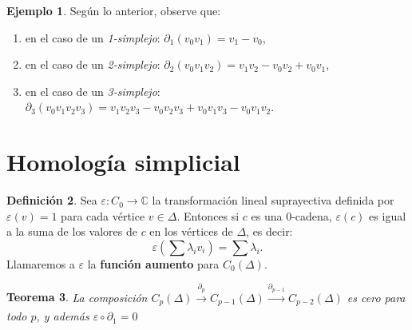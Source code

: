 \documentclass[12pt]{book}
\newtheorem{theorem}{Teorema}[section]
\theoremstyle{definition}
\newtheorem{definition}[theorem]{Definición}
\newtheorem{example}[theorem]{Ejemplo}
\newcounter{in}
\newcounter{ini}
\begin{document}
  \begin{example}
    Según lo anterior, observe que:
  \begin{enumerate}
  \item en el caso de un \emph{1-simplejo}: $\partial_{1}(v_{0}v_{1})= v_{1}-v_{0}$,
  \item en el caso de un \emph{2-simplejo}: $\partial_{2}(v_{0}v_{1}v_{2})=v_{1}v_{2}-v_{0}v_{2}+v_{0}v_{1}$,
  \item  en el caso de un \emph{3-simplejo}:
    $\partial_{3}(v_{0}v_{1}v_{2}v_{3})=v_{1}v_{2}v_{3}-v_{0}v_{2}v_{3}+v_{0}v_{1}v_{3}-v_{0}v_{1}v_{2}$. 
  \end{enumerate}
\end{example}

\section{Homología simplicial}
\label{hom_simpl}
\begin{definition}
  Sea $\varepsilon:C_{0}\rightarrow \mathbb{C}$ la transformación
  lineal suprayectiva definida por $\varepsilon(v)=1$ para cada
  vértice $v\in \Delta$. Entonces si $c$ es una $0$-cadena,
  $\varepsilon(c)$ es igual a la suma de los valores de $c$ en los
  vértices de $\Delta$, es decir:
  $$\varepsilon(\sum \lambda_{i}v_{i})=\sum\lambda_{i}.$$
  Llamaremos a $\varepsilon$ la \textbf{función aumento} para
  $C_{0}(\Delta)$.
\end{definition}

\begin{theorem}
  \label{b_op_1}
  La composición $C_{p}(\Delta)\xrightarrow[]{\partial_{p}}C_{p-1}(\Delta)\xrightarrow[]{\partial_{p-1}}C_{p-2}(\Delta)$ es cero para todo $p$, y además $\varepsilon \circ \partial_{1} = 0$
\end{theorem}
\end{document}
